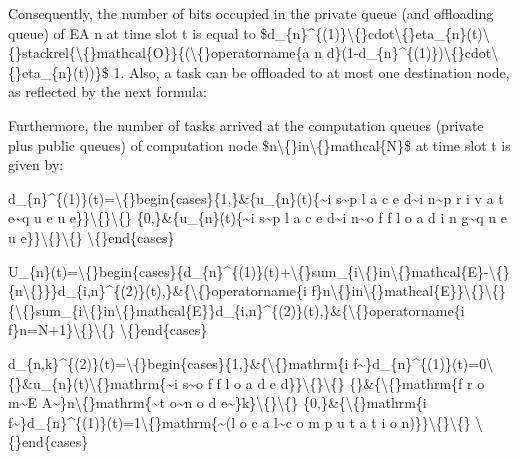 \documentclass{article}
\begin{document}
Consequently, the number of bits occupied in the private queue (and offloading queue) of EA n at time slot t is equal to \$d\_\{n\}\textasciicircum{}\{(1)\}\textbackslash\{\}cdot\textbackslash\{\}eta\_\{n\}(t)\textbackslash\{\}stackrel\{\textbackslash\{\}mathcal\{O\}\}\{(\textbackslash\{\}operatorname\{a n d\}(1-d\_\{n\}\textasciicircum{}\{(1)\})\textbackslash\{\}cdot\textbackslash\{\}eta\_\{n\}(t))\}\$ 1. Also, a task can be offloaded to at most one destination node, as reflected by the next formula:

Furthermore, the number of tasks arrived at the computation queues (private plus public queues) of computation node \$n\textbackslash\{\}in\textbackslash\{\}mathcal\{N\}\$ at time slot t is given by:

d\_\{n\}\textasciicircum{}\{(1)\}(t)=\textbackslash\{\}begin\{cases\}\{1,\}\&\{u\_\{n\}(t)\{\textasciitilde{}i s\textasciitilde{}p l a c e d\textasciitilde{}i n\textasciitilde{}p r i v a t e\textasciitilde{}q u e u e\}\}\textbackslash\{\}\textbackslash\{\} \{0,\}\&\{u\_\{n\}(t)\{\textasciitilde{}i s\textasciitilde{}p l a c e d\textasciitilde{}i n\textasciitilde{}o f f l o a d i n g\textasciitilde{}q u e u e\}\}\textbackslash\{\}\textbackslash\{\} \textbackslash\{\}end\{cases\}

U\_\{n\}(t)=\textbackslash\{\}begin\{cases\}\{d\_\{n\}\textasciicircum{}\{(1)\}(t)+\textbackslash\{\}sum\_\{i\textbackslash\{\}in\textbackslash\{\}mathcal\{E\}-\textbackslash\{\}\{n\textbackslash\{\}\}\}d\_\{i,n\}\textasciicircum{}\{(2)\}(t),\}\&\{\textbackslash\{\}operatorname\{i f\}n\textbackslash\{\}in\textbackslash\{\}mathcal\{E\}\}\textbackslash\{\}\textbackslash\{\} \{\textbackslash\{\}sum\_\{i\textbackslash\{\}in\textbackslash\{\}mathcal\{E\}\}d\_\{i,n\}\textasciicircum{}\{(2)\}(t),\}\&\{\textbackslash\{\}operatorname\{i f\}n=N+1\}\textbackslash\{\}\textbackslash\{\} \textbackslash\{\}end\{cases\}

d\_\{n,k\}\textasciicircum{}\{(2)\}(t)=\textbackslash\{\}begin\{cases\}\{1,\}\&\{\textbackslash\{\}mathrm\{i f\textasciitilde{}\}d\_\{n\}\textasciicircum{}\{(1)\}(t)=0\textbackslash\{\}\&u\_\{n\}(t)\textbackslash\{\}mathrm\{\textasciitilde{}i s\textasciitilde{}o f f l o a d e d\}\}\textbackslash\{\}\textbackslash\{\} \{\}\&\{\textbackslash\{\}mathrm\{f r o m\textasciitilde{}E A\textasciitilde{}\}n\textbackslash\{\}mathrm\{\textasciitilde{}t o\textasciitilde{}n o d e\textasciitilde{}\}k\}\textbackslash\{\}\textbackslash\{\} \{0,\}\&\{\textbackslash\{\}mathrm\{i f\textasciitilde{}\}d\_\{n\}\textasciicircum{}\{(1)\}(t)=1\textbackslash\{\}mathrm\{\textasciitilde{}(l o c a l\textasciitilde{}c o m p u t a t i o n)\}\}\textbackslash\{\}\textbackslash\{\} \textbackslash\{\}end\{cases\}
\end{document}
